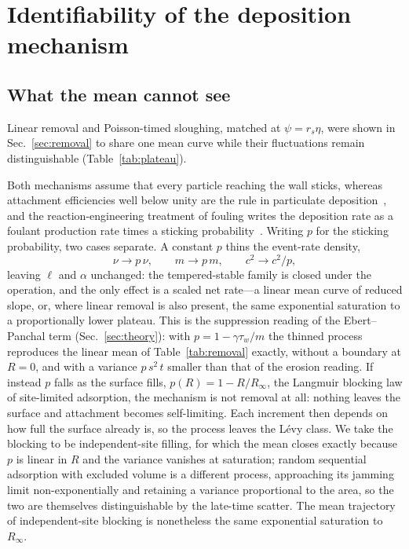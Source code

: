 \documentclass[preprint,12pt]{elsarticle}
\begin{document}
\section{Identifiability of the deposition mechanism}
\label{sec:identifiability}
\subsection{What the mean cannot see}
\label{sec:removal_summary}

Linear removal and Poisson-timed sloughing, matched at $\psi=r_s\eta$, were
shown in Sec.~\ref{sec:removal} to share one mean curve while their
fluctuations remain distinguishable (Table~\ref{tab:plateau}).

Both mechanisms assume that every particle reaching the wall sticks, whereas
attachment efficiencies well below unity are the
rule in particulate deposition~\cite{Yao1971,Epstein1988}, and the reaction-engineering treatment of fouling writes the deposition rate as a foulant production rate times a sticking probability~\cite{PatersonFryer1988}. Writing $p$ for the sticking probability, two cases separate. A constant $p$ thins the event-rate density,
\begin{equation}
  \nu\to p\,\nu,\qquad m\to p\,m,\qquad c^{2}\to c^{2}/p,
  \label{eq:thinning}
\end{equation}
leaving $\ell$ and $\alpha$ unchanged: the tempered-stable family is closed
under the operation, and the only effect is a scaled net rate---a linear
mean curve of reduced slope, or, where linear removal is also present, the
same exponential saturation to a proportionally lower plateau.
This is the suppression reading of the Ebert--Panchal term
(Sec.~\ref{sec:theory}): with $p=1-\gamma\tau_w/m$ the thinned process
reproduces the linear mean of Table~\ref{tab:removal} exactly, without a
boundary at $R=0$, and with a variance $p\,s^2\,t$ smaller than that
of the erosion reading. If instead $p$
falls as the surface fills, $p(R)=1-R/R_\infty$, the Langmuir blocking law of
site-limited adsorption, the mechanism is not removal at all: nothing leaves
the surface and attachment becomes self-limiting. Each increment then depends
on how full the surface already is, so the process leaves the L\'evy class.
We take the blocking to be independent-site filling, for which the mean closes
exactly because $p$ is linear in $R$ and the variance vanishes at saturation;
random sequential adsorption with excluded volume is a different process,
approaching its jamming limit non-exponentially and retaining a variance
proportional to the area, so the two are themselves distinguishable by the
late-time scatter. The mean trajectory of independent-site blocking is
nonetheless the same exponential saturation to $R_\infty$.
\end{document}
